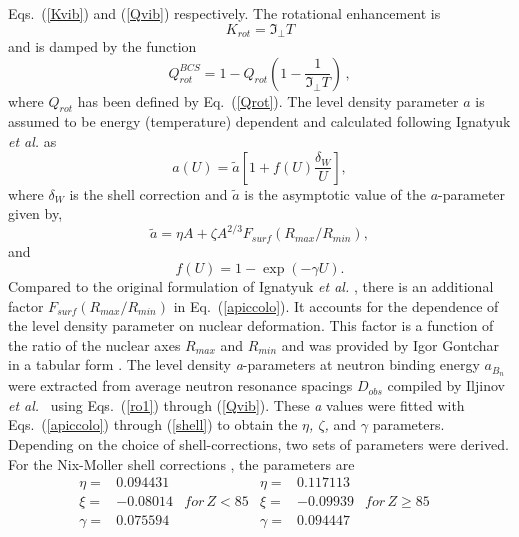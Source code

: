 Eqs.~(\ref{Kvib}) and (\ref{Qvib}) respectively. The rotational enhancement is
\begin{equation}
K_{rot}=\Im_{\perp}T  \label{KrotBCS}
\end{equation}
and is damped by the function
\begin{equation}
Q_{rot}^{BCS}=1-Q_{rot}\left(1-\frac{1}{\Im_{\perp}T}\right)\,,
\label{QrotBCS}
\end{equation}
\noindent where $Q_{rot}$ has been defined by Eq.~(\ref{Qrot}). The level
density parameter $a$ is assumed to be energy (temperature) dependent and
calculated following Ignatyuk \emph{et al.} \cite{ignaa} as
\begin{equation}
a(U)=\widetilde{a}[1+f(U)\frac{\delta_{W}}{U}],  \label{apiccolo}
\end{equation}
\noindent where $\delta_{W}$ is the shell correction and $\widetilde{a}$ is
the asymptotic value of the $a$-parameter given by,
\begin{equation}
\widetilde{a}=\eta A+\zeta A^{2/3}F_{surf}(R_{max}/R_{min}),  \label{aassym}
\end{equation}
and
\begin{equation}
f(U)=1-\exp(-\gamma U).  \label{shell}
\end{equation}
Compared to the original formulation of Ignatyuk \emph{et al.} \cite{ignaa},
there is an additional factor $F_{surf}(R_{max}/R_{min})$ in
Eq.~(\ref{apiccolo}).
It accounts for the dependence of the level density parameter on
nuclear deformation. This factor is a function of the ratio of the nuclear axes $%
R_{max}$ and $R_{min}$ and was provided by Igor Gontchar \cite{gontchar} in
a tabular form . The level density \emph{a}-parameters at neutron binding
energy $a_{B_{n}}$ were extracted from average neutron
resonance spacings $D_{obs}$ compiled by Iljinov
\textit{et al.}~\cite{Mebel} using Eqs.~(\ref{ro1}) through (\ref{Qvib}).
These \emph{a} values were fitted with Eqs.~(\ref{apiccolo})
through (\ref{shell}) to obtain the \emph{$\eta$, $\zeta$,} and
\emph{$\gamma$} parameters. Depending on the choice of shell-corrections,
two sets of parameters were derived. For the Nix-Moller shell corrections
\cite{masses}, the parameters are
\begin{equation}
\begin{array}{ccccccc}
\eta= & 0.094431 &  & \eta= & 0.117113 &  &  \\
\xi= & -0.08014 & for\, Z<85 & \xi= & -0.09939 & for\, Z\geq85 &  \\
\gamma= & 0.075594 &  & \gamma= & 0.094447 &  &
\end{array}%
\end{equation}
